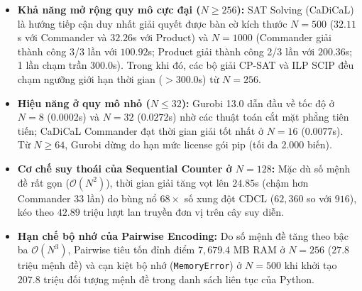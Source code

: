 \documentclass[a4paper,fleqn]{cas-sc}
\begin{document}
\begin{tcolorbox}[
    colback=boxbg, colframe=boxborder, arc=2mm, boxrule=0.85pt,
    left=12pt, right=12pt, top=8pt, bottom=8pt,
    title=\textbf{\color{primaryblue}Tóm tắt các Phát hiện Thực nghiệm Cốt lõi (Key Experimental Takeaways)},
    coltitle=primaryblue
]
\begin{itemize}[leftmargin=1.5em, itemsep=0.25em, topsep=0.2em]
    \item \textbf{Khả năng mở rộng quy mô cực đại ($N \ge 256$):} SAT Solving (CaDiCaL) là hướng tiếp cận duy nhất giải quyết được bàn cờ kích thước $N=500$ ($32.11$s với Commander và $32.26$s với Product) và $N=1000$ (Commander giải thành công 3/3 lần với $100.92$s; Product giải thành công 2/3 lần với $200.36$s; 1 lần chạm trần 300.0s). Trong khi đó, các bộ giải CP-SAT và ILP SCIP đều chạm ngưỡng giới hạn thời gian ($>300.0$s) từ $N=256$.
    \item \textbf{Hiệu năng ở quy mô nhỏ ($N \le 32$):} Gurobi 13.0 dẫn đầu về tốc độ ở $N=8$ ($0.0002$s) và $N=32$ ($0.0272$s) nhờ các thuật toán cắt mặt phẳng tiên tiến; CaDiCaL Commander đạt thời gian giải tốt nhất ở $N=16$ ($0.0077$s). Từ $N \ge 64$, Gurobi dừng do hạn mức license gói pip (tối đa 2.000 biến).
    \item \textbf{Cơ chế suy thoái của Sequential Counter ở $N=128$:} Mặc dù số mệnh đề rất gọn ($\mathcal{O}(N^2)$), thời gian giải tăng vọt lên $24.85$s (chậm hơn Commander 33 lần) do bùng nổ $68\times$ số xung đột CDCL ($62{,}360$ so với $916$), kéo theo $42.89$ triệu lượt lan truyền đơn vị trên cây suy diễn.
    \item \textbf{Hạn chế bộ nhớ của Pairwise Encoding:} Do số mệnh đề tăng theo bậc ba $\mathcal{O}(N^3)$, Pairwise tiêu tốn đỉnh điểm $7{,}679.4$ MB RAM ở $N=256$ ($27.8$ triệu mệnh đề) và cạn kiệt bộ nhớ (\texttt{MemoryError}) ở $N=500$ khi khởi tạo $207.8$ triệu đối tượng mệnh đề trong danh sách liên tục của Python.
\end{itemize}
\end{tcolorbox}
\end{document}
